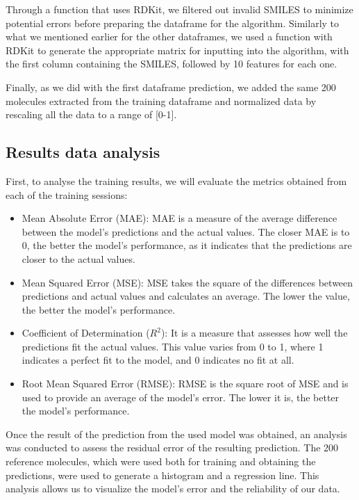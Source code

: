 \documentclass[final,times,twocolumn,article]{elsarticle}
\begin{document}
Through a function that uses RDKit, we filtered out invalid SMILES to minimize potential errors before preparing the dataframe for the algorithm. Similarly to what we mentioned earlier for the other dataframes, we used a function with RDKit to generate the appropriate matrix for inputting into the algorithm, with the first column containing the SMILES, followed by 10 features for each one. 

Finally, as we did with the first dataframe prediction, we added the same 200 molecules extracted from the training dataframe and normalized data by rescaling all the data to a range of [0-1].

\subsection{Results data analysis}

First, to analyse the training results, we will evaluate the metrics obtained from each of the training sessions:

\begin{itemize}
    \item Mean Absolute Error (MAE): MAE is a measure of the average difference between the model's predictions and the actual values. The closer MAE is to 0, the better the model's performance, as it indicates that the predictions are closer to the actual values.
    \item Mean Squared Error (MSE): MSE takes the square of the differences between predictions and actual values and calculates an average. The lower the value, the better the model's performance. 
    \item Coefficient of Determination ($R^2$): It is a measure that assesses how well the predictions fit the actual values. This value varies from 0 to 1, where 1 indicates a perfect fit to the model, and 0 indicates no fit at all. 
    \item Root Mean Squared Error (RMSE): RMSE is the square root of MSE and is used to provide an average of the model's error. The lower it is, the better the model's performance. 
    \end{itemize}

Once the result of the prediction from the used model was obtained, an analysis was conducted to assess the residual error of the resulting prediction. The 200 reference molecules, which were used both for training and obtaining the predictions, were used to generate a histogram and a regression line. This analysis allows us to visualize the model's error and the reliability of our data. 
\end{document}

